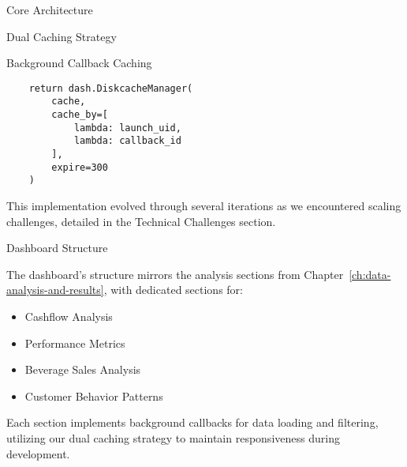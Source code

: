 \begin{section}{Core Architecture}
\begin{subsection}{Dual Caching Strategy}
\begin{subsubsection}{Background Callback Caching}
\begin{listing}[H]
\begin{verbatim}
    return dash.DiskcacheManager(
        cache,
        cache_by=[
            lambda: launch_uid,
            lambda: callback_id
        ],
        expire=300
    )
				\end{verbatim}
				\label{listing:dashboard-implementation-callback-cache}
			\end{listing}

			This implementation evolved through several iterations as we encountered scaling challenges, detailed in the Technical Challenges section.

		\end{subsubsection}

		\begin{subsection}{Dashboard Structure}
			\label{subsec:implementation-core-architecture-structure}

			The dashboard's structure mirrors the analysis sections from Chapter~\ref{ch:data-analysis-and-results}, with dedicated sections for:

			\begin{itemize}
				\item Cashflow Analysis
				\item Performance Metrics
				\item Beverage Sales Analysis
				\item Customer Behavior Patterns
			\end{itemize}

			Each section implements background callbacks for data loading and filtering, utilizing our dual caching strategy to maintain responsiveness during development.

		\end{subsection}
	\end{subsection}
\end{section}

